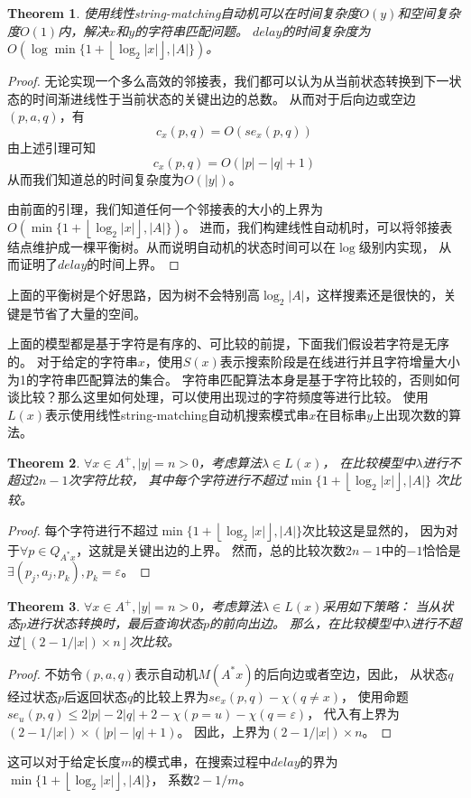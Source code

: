 \documentclass[UTF8]{ctexart}
\newtheorem{thm}{Theorem}[subsection]
\theoremstyle{definition}
\theoremstyle{remark}
\numberwithin{equation}{subsection}
\begin{document}
	\begin{thm}
		使用线性string-matching自动机可以在时间复杂度$O(y)$和空间复杂度$O(1)$内，解决$x$和$y$的字符串匹配问题。
		$delay$的时间复杂度为$O(\log \min \{1 + \left\lfloor \log_2|x| \right\rfloor, |A| \})$。
	\end{thm}
	\begin{proof}
		无论实现一个多么高效的邻接表，我们都可以认为从当前状态转换到下一状态的时间渐进线性于当前状态的关键出边的总数。
		从而对于后向边或空边$(p,a,q)$，有
		\[
			c_x(p, q) = O(se_x(p, q))
		\]
		由上述引理可知
		\[
			c_x(p, q) = O(|p|-|q|+1)
		\]
		从而我们知道总的时间复杂度为$O(|y|)$。
		
		由前面的引理，我们知道任何一个邻接表的大小的上界为$O(\min\{1+\left\lfloor \log_2|x| \right\rfloor, |A|\})$。
		进而，我们构建线性自动机时，可以将邻接表结点维护成一棵平衡树。从而说明自动机的状态时间可以在$\log$级别内实现，
		从而证明了$delay$的时间上界。
	\end{proof}
	上面的平衡树是个好思路，因为树不会特别高$\log_2|A|$，这样搜素还是很快的，关键是节省了大量的空间。
	
	上面的模型都是基于字符是有序的、可比较的前提，下面我们假设若字符是无序的。
	对于给定的字符串$x$，使用$S(x)$表示搜索阶段是在线进行并且字符增量大小为1的字符串匹配算法的集合。
	字符串匹配算法本身是基于字符比较的，否则如何谈比较？那么这里如何处理，可以使用出现过的字符频度等进行比较。
	使用$L(x)$表示使用线性string-matching自动机搜索模式串$x$在目标串$y$上出现次数的算法。
	
	\begin{thm}
		$\forall x \in A^+, |y| = n > 0$，考虑算法$\lambda \in L(x)$，
		在比较模型中$\lambda$进行不超过$2n-1$次字符比较，
		其中每个字符进行不超过$\min \{1+\left\lfloor \log_2|x| \right\rfloor, |A| \}$ 次比较。
	\end{thm}
	\begin{proof}
		每个字符进行不超过$\min \{1+\left\lfloor \log_2|x| \right\rfloor, |A| \}$次比较这是显然的，
		因为对于$\forall p \in Q_{A^*x}$，这就是关键出边的上界。
		然而，总的比较次数$2n-1$中的$-1$恰恰是$\exists (p_j,a_j,p_k), p_k=\varepsilon$。
	\end{proof}
	
	\begin{thm}
		$\forall x \in A^+, |y| = n > 0$，考虑算法$\lambda \in L(x)$采用如下策略：
		当从状态$p$进行状态转换时，最后查询状态$p$的前向出边。
		那么，在比较模型中$\lambda$进行不超过$\left\lfloor (2 - 1 / |x|) \times n \right\rfloor$次比较。
	\end{thm}
	\begin{proof}
		不妨令$(p, a, q)$表示自动机$M(A^*x)$的后向边或者空边，因此，
		从状态$q$经过状态$p$后返回状态$q$的比较上界为$se_x(p,q) - \chi(q \neq x)$，
		使用命题$se_u(p, q) \le 2|p| - 2|q| + 2 - \chi(p=u) - \chi(q=\varepsilon)$，
		代入有上界为$(2 - 1 / |x|) \times (|p| - |q| + 1)$。
		因此，上界为$(2 - 1 / |x|) \times n$。
	\end{proof}
	这可以对于给定长度$m$的模式串，在搜索过程中$delay$的界为
	$\min \{1+\left\lfloor \log_2|x| \right\rfloor, |A| \}$， 系数$2-1 / m$。
	
\end{document}
